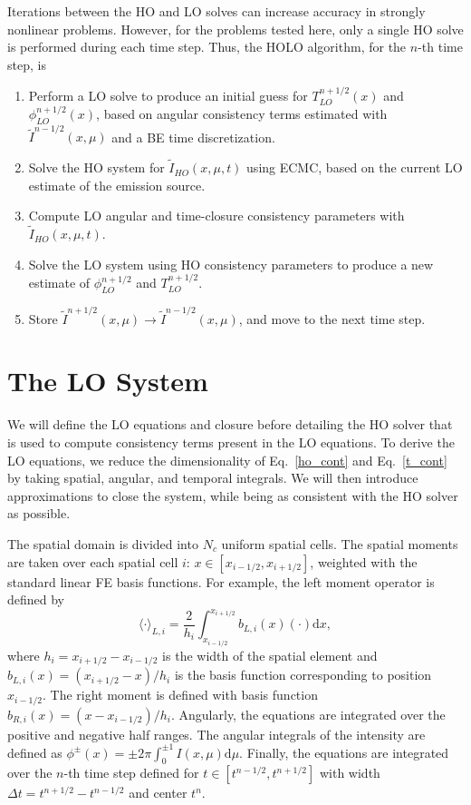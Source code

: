 \documentclass{anstrans}
\renewcommand{\d}{\mathrm{d}}
\newcommand{\mom}[1]{\langle #1 \rangle}
\newcommand{\xr}{{x_{i+1/2}}}
\begin{document}
Iterations between the HO and LO solves can increase accuracy in strongly nonlinear
problems. However, for the problems tested here, only a single HO solve is performed during each
time step.  Thus, the HOLO algorithm, for the $n$-th time step, is
\begin{enumerate}
    \item Perform a LO solve to produce an initial guess for $T_{LO}^{n+1/2}(x)$
        and $\phi_{LO}^{n+1/2}(x)$, based on angular consistency terms estimated with
        $\tilde{I}^{n-1/2}(x,\mu)$ and a BE time discretization.
\item Solve the HO system for $\tilde{I}_{HO}(x,\mu,t)$ using ECMC, based on the current
    LO estimate of the emission source.%
\item Compute LO angular and time-closure consistency parameters with
    $\tilde{I}_{HO}(x,\mu,t)$.  
\item Solve the LO system using HO consistency parameters to produce a new
    estimate of $\phi^{n+1/2}_{LO}$ and $T^{n+1/2}_{LO}$.
\item Store $\tilde{I}^{n+1/2}(x,\mu)\rightarrow\tilde{I}^{n-1/2}(x,\mu)$, and move to the next time step.
\end{enumerate}

\section{The LO System}
\label{sec:lo}

We will define the LO equations and closure before detailing the HO solver that is used to compute
consistency terms present in the LO equations.
To derive the LO equations, we reduce the dimensionality of Eq.~\eqref{ho_cont} and
Eq.~\eqref{t_cont} by taking spatial, angular, and
temporal integrals.  We will then introduce approximations to
close the system, while being as consistent with the HO solver as possible. 

The spatial domain is divided into $N_c$ uniform spatial cells.
The spatial moments are taken over each spatial cell $i$:
$x\in[x_{i-1/2},x_{i+1/2}]$, weighted with the standard linear FE basis functions.  For example, the left moment operator is defined by
\begin{equation}\label{x_mom}
    \mom{\cdot}_{L,i} = \frac{2}{h_i} \int_{x_{i-1/2}}^{\xr} b_{L,i}(x) (\cdot) \d x,
\end{equation}
where $h_i=x_{i+1/2}-x_{i-1/2}$ is the width of the spatial element and
$b_{L,i}(x)=(x_{i+1/2}-x)/h_i$ is the basis function corresponding to position
$x_{i-1/2}$.  The right moment is defined with basis function $b_{R,i}(x)=(x - x_{i-1/2})/h_i$.
Angularly, the equations are integrated over the positive and negative half
ranges.  The angular integrals of the intensity are defined as $\phi^\pm(x) = \pm2\pi
\int_0^{\pm 1} I(x,\mu) \d \mu$.  Finally, the equations are integrated over the $n$-th
time step defined for $t\in[t^{n-1/2},t^{n+1/2}]$ with width $\Delta t = t^{n+1/2}-t^{n-1/2}$ and
center $t^{n}$.  
\end{document}
